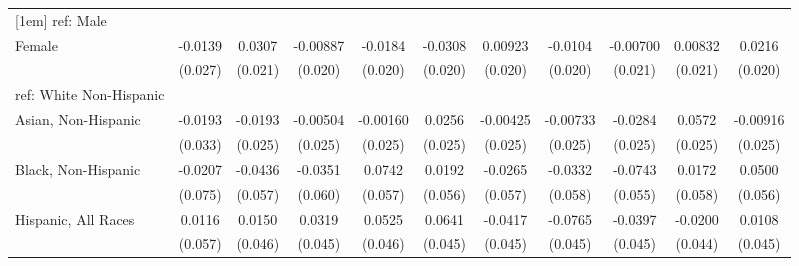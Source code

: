 \begin{table}[htbp]
\begin{tabular}{l*{10}{c}}
[1em]
ref: Male&                     &                     &                     &                     &                     &                     &                     &                     &                     &                     \\
[1em]
Female&     -0.0139         &      0.0307         &    -0.00887         &     -0.0184         &     -0.0308         &     0.00923         &     -0.0104         &    -0.00700         &     0.00832         &      0.0216         \\
  &     (0.027)         &     (0.021)         &     (0.020)         &     (0.020)         &     (0.020)         &     (0.020)         &     (0.020)         &     (0.021)         &     (0.021)         &     (0.020)         \\
[1em]
ref: White Non-Hispanic&                     &                     &                     &                     &                     &                     &                     &                     &                     &                     \\
[1em]
Asian, Non-Hispanic&     -0.0193         &     -0.0193         &    -0.00504         &    -0.00160         &      0.0256         &    -0.00425         &    -0.00733         &     -0.0284         &      0.0572\sym{**} &    -0.00916         \\
  &     (0.033)         &     (0.025)         &     (0.025)         &     (0.025)         &     (0.025)         &     (0.025)         &     (0.025)         &     (0.025)         &     (0.025)         &     (0.025)         \\
[1em]
Black, Non-Hispanic&     -0.0207         &     -0.0436         &     -0.0351         &      0.0742         &      0.0192         &     -0.0265         &     -0.0332         &     -0.0743         &      0.0172         &      0.0500         \\
  &     (0.075)         &     (0.057)         &     (0.060)         &     (0.057)         &     (0.056)         &     (0.057)         &     (0.058)         &     (0.055)         &     (0.058)         &     (0.056)         \\
[1em]
Hispanic, All Races&      0.0116         &      0.0150         &      0.0319         &      0.0525         &      0.0641         &     -0.0417         &     -0.0765\sym{*}  &     -0.0397         &     -0.0200         &      0.0108         \\
  &     (0.057)         &     (0.046)         &     (0.045)         &     (0.046)         &     (0.045)         &     (0.045)         &     (0.045)         &     (0.045)         &     (0.044)         &     (0.045)         \\

\end{tabular}
\end{table}
